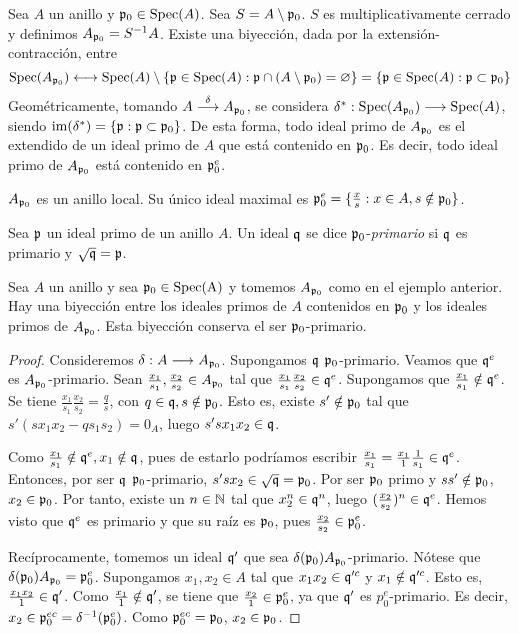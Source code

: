 \documentclass[../main.tex]{subfiles}
\begin{document}
	\begin{example}
Sea $A$ un anillo y $\mathfrak{p}_0\in \operatorname{Spec}(A)$. Sea $S=A\setminus\mathfrak{p}_0$. $S$ es multiplicativamente cerrado y definimos $A_{\mathfrak{p}_0}=S^{-1}A$. Existe una biyección, dada por la extensión-contracción, entre $$\operatorname{Spec}(A_{\mathfrak{p}_0})\longleftrightarrow \operatorname{Spec}(A)\setminus\{\mathfrak{p}\in \operatorname{Spec}(A):\mathfrak{p}\cap(A\setminus\mathfrak{p}_0)=\varnothing\}=\{\mathfrak{p}\in \operatorname{Spec}(A):\mathfrak{p}\subset\mathfrak{p}_0\}$$
Geométricamente, tomando $A\overset{\delta}{\longrightarrow}A_{\mathfrak{p}_0}$, se considera $\delta^{\ast}:\operatorname{Spec}(A_{\mathfrak{p}_0})\longrightarrow \operatorname{Spec}(A)$, siendo $\operatorname{im}(\delta^{\ast})=\{\mathfrak{p}:\mathfrak{p}\subset \mathfrak{p}_0\}$. De esta forma, todo ideal primo de $A_{\mathfrak{p}_0}$ es el extendido de un ideal primo de $A$ que está contenido en $\mathfrak{p}_0$. Es decir, todo ideal primo de $A_{\mathfrak{p}_0}$ está contenido en $\mathfrak{p}_0^e$.

$A_{\mathfrak{p}_0}$ es un anillo local. Su único ideal maximal es $\mathfrak{p}_0^e=\{\frac{x}{s}:x\in A, s\notin\mathfrak{p}_0\}$.
\end{example}
\begin{definition}
Sea $\mathfrak{p}$ un ideal primo de un anillo $A$. Un ideal $\mathfrak{q}$ se dice $\mathfrak{p}_0$-\textit{primario} si $\mathfrak{q}$ es primario y $\sqrt{\mathfrak{q}}=\mathfrak{p}$.
\end{definition}
\begin{proposition}
Sea $A$ un anillo y sea $\mathfrak{p}_0\in \operatorname{Spec(A)}$ y tomemos $A_{\mathfrak{p}_0}$ como en el ejemplo anterior. Hay una biyección entre los ideales primos de $A$ contenidos en $\mathfrak{p}_0$ y los ideales primos de $A_{\mathfrak{p}_0}$. Esta biyección conserva el ser $\mathfrak{p}_0$-primario.
\end{proposition}
\begin{proof}
Consideremos $\delta:A\longrightarrow A_{\mathfrak{p}_0}$. Supongamos $\mathfrak{q}$ $\mathfrak{p}_0$-primario. Veamos que $\mathfrak{q}^e$ es $A_{\mathfrak{p}_0}$-primario. Sean $\frac{x_1}{s_1},\frac{x_2}{s_2}\in A_{\mathfrak{p}_0}$ tal que $\frac{x_1}{s_1}\frac{x_2}{s_2}\in\mathfrak{q}^e$. Supongamos que $\frac{x_1}{s_1}\notin\mathfrak{q}^e$. Se tiene $\frac{x_1}{s_1}\frac{x_2}{s_2}=\frac{q}{s}$, con $q\in\mathfrak{q}, s\notin\mathfrak{p}_0$. Esto es, existe $s'\notin\mathfrak{p}_0$ tal que $s'(sx_1x_2-qs_1s_2)=0_A$, luego $s'sx_1x_2\in\mathfrak{q}$.

Como $\frac{x_1}{s_1}\notin \mathfrak{q}^e, x_1\notin\mathfrak{q}$, pues de estarlo podríamos escribir $\frac{x_1}{s_1}=\frac{x_1}{1}\frac{1}{s_1}\in\mathfrak{q}^e$. Entonces, por ser $\mathfrak{q}$ $\mathfrak{p}_0$-primario, $s'sx_2\in\sqrt{\mathfrak{q}}=\mathfrak{p}_0$. Por ser $\mathfrak{p}_0$ primo y $ss'\notin\mathfrak{p}_0$, $x_2\in\mathfrak{p}_0$. Por tanto, existe un $n\in\mathbb{N}$ tal que $x_2^n\in\mathfrak{q}^n$, luego $(\frac{x_2}{s_2})^n\in\mathfrak{q}^e$. Hemos visto que $\mathfrak{q}^e$ es primario y que su raíz es $\mathfrak{p}_0$, pues $\frac{x_2}{s_2}\in\mathfrak{p}_0^e$.

Recíprocamente, tomemos un ideal $\mathfrak{q}'$ que sea $\delta(\mathfrak{p}_0)A_{\mathfrak{p}_0}$-primario. Nótese que $\delta(\mathfrak{p}_0)A_{\mathfrak{p}_0}=\mathfrak{p}_0^e$. Supongamos $x_1,x_2\in A$ tal que $x_1x_2\in\mathfrak{q}'^c$ y $x_1\notin\mathfrak{q}'^c$. Esto es, $\frac{x_1x_2}{1}\in\mathfrak{q}'$. Como $\frac{x_1}{1}\notin\mathfrak{q}'$, se tiene que $\frac{x_2}{1}\in\mathfrak{p}_0^e$, ya que $\mathfrak{q}'$ es $p_0^e$-primario. Es decir, $x_2\in\mathfrak{p}_0^{ec}= \delta^{-1}(\mathfrak{p}_0^e)$. Como $\mathfrak{p}_0^{ec}=\mathfrak{p}_0$, $x_2\in\mathfrak{p}_0$.
\end{proof}
\end{document}
